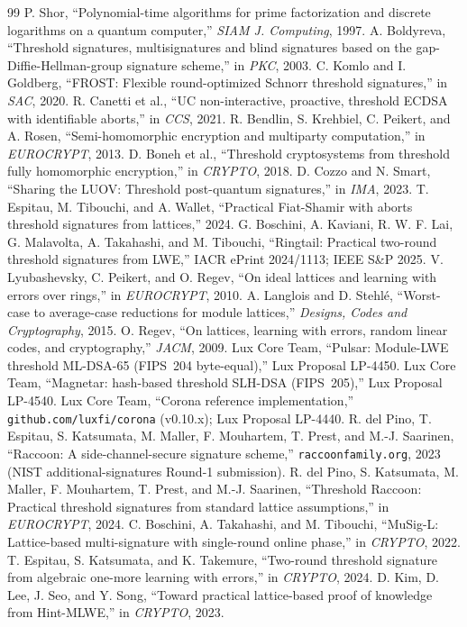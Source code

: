 \begin{thebibliography}{99}
 P. Shor, ``Polynomial-time algorithms for prime factorization and discrete logarithms on a quantum computer,'' \emph{SIAM J. Computing}, 1997.
 A. Boldyreva, ``Threshold signatures, multisignatures and blind signatures based on the gap-Diffie-Hellman-group signature scheme,'' in \emph{PKC}, 2003.
 C. Komlo and I. Goldberg, ``FROST: Flexible round-optimized Schnorr threshold signatures,'' in \emph{SAC}, 2020.
 R. Canetti et al., ``UC non-interactive, proactive, threshold ECDSA with identifiable aborts,'' in \emph{CCS}, 2021.
 R. Bendlin, S. Krehbiel, C. Peikert, and A. Rosen, ``Semi-homomorphic encryption and multiparty computation,'' in \emph{EUROCRYPT}, 2013.
 D. Boneh et al., ``Threshold cryptosystems from threshold fully homomorphic encryption,'' in \emph{CRYPTO}, 2018.
 D. Cozzo and N. Smart, ``Sharing the LUOV: Threshold post-quantum signatures,'' in \emph{IMA}, 2023.
 T. Espitau, M. Tibouchi, and A. Wallet, ``Practical Fiat-Shamir with aborts threshold signatures from lattices,'' 2024.
 G. Boschini, A. Kaviani, R. W. F. Lai, G. Malavolta, A. Takahashi, and M. Tibouchi, ``Ringtail: Practical two-round threshold signatures from LWE,'' IACR ePrint 2024/1113; IEEE S\&P 2025.
 V. Lyubashevsky, C. Peikert, and O. Regev, ``On ideal lattices and learning with errors over rings,'' in \emph{EUROCRYPT}, 2010.
 A. Langlois and D. Stehl\'e, ``Worst-case to average-case reductions for module lattices,'' \emph{Designs, Codes and Cryptography}, 2015.
 O. Regev, ``On lattices, learning with errors, random linear codes, and cryptography,'' \emph{JACM}, 2009.
 Lux Core Team, ``Pulsar: Module-LWE threshold ML-DSA-65 (FIPS~204 byte-equal),'' Lux Proposal LP-4450.
 Lux Core Team, ``Magnetar: hash-based threshold SLH-DSA (FIPS~205),'' Lux Proposal LP-4540.
 Lux Core Team, ``Corona reference implementation,'' \texttt{github.com/luxfi/corona} (v0.10.x); Lux Proposal LP-4440.
 R. del Pino, T. Espitau, S. Katsumata, M. Maller, F. Mouhartem, T. Prest, and M.-J. Saarinen, ``Raccoon: A side-channel-secure signature scheme,'' \texttt{raccoonfamily.org}, 2023 (NIST additional-signatures Round-1 submission).
 R. del Pino, S. Katsumata, M. Maller, F. Mouhartem, T. Prest, and M.-J. Saarinen, ``Threshold Raccoon: Practical threshold signatures from standard lattice assumptions,'' in \emph{EUROCRYPT}, 2024.
 C. Boschini, A. Takahashi, and M. Tibouchi, ``MuSig-L: Lattice-based multi-signature with single-round online phase,'' in \emph{CRYPTO}, 2022.
 T. Espitau, S. Katsumata, and K. Takemure, ``Two-round threshold signature from algebraic one-more learning with errors,'' in \emph{CRYPTO}, 2024.
 D. Kim, D. Lee, J. Seo, and Y. Song, ``Toward practical lattice-based proof of knowledge from Hint-MLWE,'' in \emph{CRYPTO}, 2023.
\end{thebibliography}

